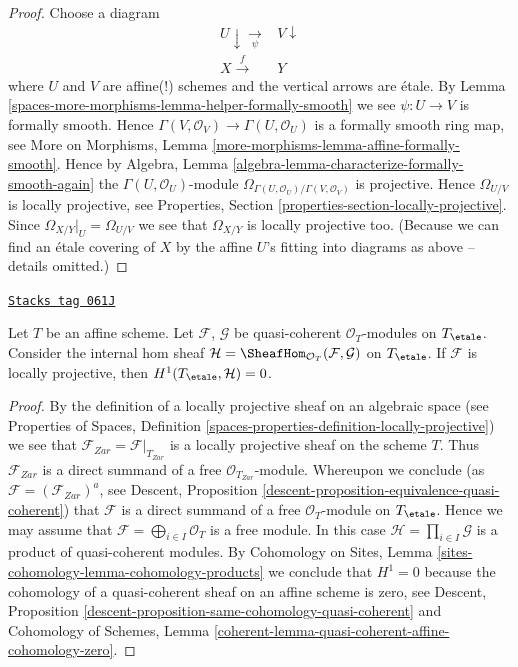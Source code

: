 \begin{proof}
Choose a diagram
$$
\begin{array}{cc}U \downarrow\underset{\psi}{\longrightarrow} & V \downarrow \\ X \overset{f}{\longrightarrow} & Y\end{array}
$$
where $U$ and $V$ are affine(!) schemes and the vertical arrows are \'etale.
By
Lemma \ref{spaces-more-morphisms-lemma-helper-formally-smooth}
we see $\psi : U \to V$ is formally smooth. Hence
$\Gamma(V, \mathcal{O}_V) \to \Gamma(U, \mathcal{O}_U)$ is
a formally smooth ring map, see
More on Morphisms, Lemma \ref{more-morphisms-lemma-affine-formally-smooth}.
Hence by
Algebra, Lemma \ref{algebra-lemma-characterize-formally-smooth-again}
the $\Gamma(U, \mathcal{O}_U)$-module
$\Omega_{\Gamma(U, \mathcal{O}_U)/\Gamma(V, \mathcal{O}_V)}$
is projective. Hence $\Omega_{U/V}$ is locally projective, see
Properties, Section \ref{properties-section-locally-projective}.
Since $\Omega_{X/Y}|_U = \Omega_{U/V}$ we see that $\Omega_{X/Y}$ is
locally projective too. (Because we can find an \'etale covering of
$X$ by the affine $U$'s fitting into diagrams as above -- details
omitted.)
\end{proof}

\begin{lemma}[H1 is zero]
\label{spaces-more-morphisms-lemma-h1-is-zero}
\href{https://stacks.math.columbia.edu/tag/061J}{\texttt{Stacks tag 061J}}

Let $T$ be an affine scheme.
Let $\mathcal{F}$, $\mathcal{G}$ be quasi-coherent
$\mathcal{O}_T$-modules on $T_\etale$.
Consider the internal hom sheaf
$\mathcal{H} = \SheafHom_{\mathcal{O}_T}(\mathcal{F}, \mathcal{G})$
on $T_\etale$.
If $\mathcal{F}$ is locally projective, then
$H^1(T_\etale, \mathcal{H}) = 0$.
\end{lemma}

\begin{proof}
By the definition of a locally projective sheaf on an algebraic space (see
Properties of Spaces,
Definition \ref{spaces-properties-definition-locally-projective})
we see that $\mathcal{F}_{Zar} = \mathcal{F}|_{T_{Zar}}$ is a locally
projective sheaf on the scheme $T$. Thus $\mathcal{F}_{Zar}$ is a
direct summand of a free $\mathcal{O}_{T_{Zar}}$-module. Whereupon
we conclude (as $\mathcal{F} = (\mathcal{F}_{Zar})^a$, see
Descent, Proposition \ref{descent-proposition-equivalence-quasi-coherent})
that $\mathcal{F}$ is a direct summand of a free $\mathcal{O}_T$-module
on $T_\etale$. Hence we may assume that
$\mathcal{F} = \bigoplus_{i \in I} \mathcal{O}_T$ is a free module.
In this case $\mathcal{H} = \prod_{i \in I} \mathcal{G}$ is
a product of quasi-coherent modules. By
Cohomology on Sites, Lemma \ref{sites-cohomology-lemma-cohomology-products}
we conclude that $H^1 = 0$ because the cohomology of a quasi-coherent sheaf
on an affine scheme is zero, see
Descent, Proposition \ref{descent-proposition-same-cohomology-quasi-coherent}
and Cohomology of Schemes, Lemma
\ref{coherent-lemma-quasi-coherent-affine-cohomology-zero}.
\end{proof}

